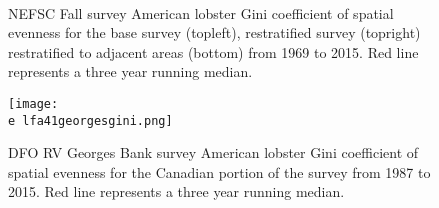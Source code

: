 \documentclass[11pt]{article}
\newcommand{\e}{/backup/bio_data/bio.lobster/figures/} %
\begin{document}
\begin{figure}
\centering
{}
\\
\caption{NEFSC Fall survey American lobster Gini coefficient of spatial evenness for the base survey (topleft), restratified survey (topright) restratified to adjacent areas (bottom) from 1969 to 2015. Red line represents a three year running median.  }
\end{figure}
\clearpage


\begin{figure}

    \texttt{[image: \\e lfa41georgesgini.png]}
    \caption{DFO RV Georges Bank survey American lobster Gini coefficient of spatial evenness for the Canadian portion of the survey from 1987 to 2015. Red line represents a three year running median. }

\end{figure}
\end{document}
